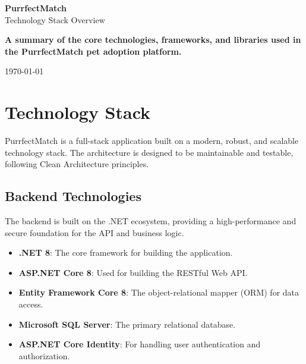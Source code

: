 \documentclass[12pt,a4paper]{article}
\begin{document}
\begin{titlepage}
    \centering
    \vspace*{4cm}
    
    {\Huge\bfseries\color{primaryblue} PurrfectMatch}\\[0.5cm]
    {\Large\color{secondarygreen} Technology Stack Overview}\\[3cm]
    
    \begin{tcolorbox}[colback=lightgray, colframe=primaryblue, width=0.9\textwidth]
        \centering
        \textbf{A summary of the core technologies, frameworks, and libraries used in the PurrfectMatch pet adoption platform.}
    \end{tcolorbox}
    
    \vfill
    
    {\Large \today}
\end{titlepage}

\newpage

\section*{Technology Stack}

PurrfectMatch is a full-stack application built on a modern, robust, and scalable technology stack. The architecture is designed to be maintainable and testable, following Clean Architecture principles.

\subsection*{Backend Technologies}

The backend is built on the .NET ecosystem, providing a high-performance and secure foundation for the API and business logic.

\begin{tcolorbox}[colback=lightgray, colframe=secondarygreen, title=Core Backend Stack]
    \begin{itemize}[leftmargin=*]
        \item \textbf{.NET 8}: The core framework for building the application.
        \item \textbf{ASP.NET Core 8}: Used for building the RESTful Web API.
        \item \textbf{Entity Framework Core 8}: The object-relational mapper (ORM) for data access.
        \item \textbf{Microsoft SQL Server}: The primary relational database.
        \item \textbf{ASP.NET Core Identity}: For handling user authentication and authorization.
    \end{itemize}
\end{tcolorbox}
\end{document}
